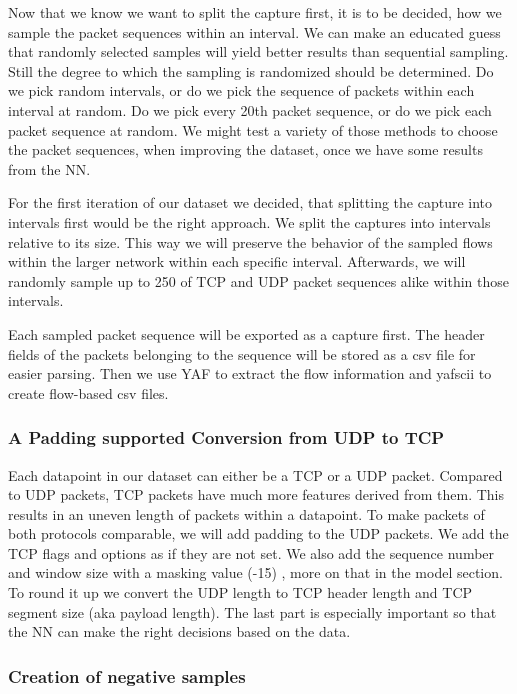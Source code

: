 \documentclass[
	ngerman,
	ruledheaders=section,%
	class=report,%
	thesis={type=bachelor},%
	accentcolor=9c,%
	custommargins=true,%
	marginpar=false,%
	parskip=half-,%
	fontsize=11pt,%
]{tudapub}
\begin{document}
Now that we know we want to split the capture first, it is to be decided, how we sample the packet sequences within an interval.
We can make an educated guess that randomly selected samples will yield better results than sequential sampling.
Still the degree to which the sampling is randomized should be determined.
Do we pick random intervals, or do we pick the sequence of packets within each interval at random.
Do we pick every 20th packet sequence, or do we pick each packet sequence at random.
We might test a variety of those methods to choose the packet sequences, when improving the dataset, once we have some results from the NN.

For the first iteration of our dataset we decided, that splitting the capture into intervals first would be the right approach.
We split the captures into intervals relative to its size.
This way we will preserve the behavior of the sampled flows within the larger network within each specific interval.
Afterwards, we will randomly sample up to 250 of TCP and UDP packet sequences alike within those intervals.

Each sampled packet sequence will be exported as a capture first.
The header fields of the packets belonging to the sequence will be stored as a csv file for easier parsing.
Then we use YAF to extract the flow information and yafscii to create flow-based csv files.

\subsubsection{A Padding supported Conversion from UDP to TCP}

Each datapoint in our dataset can either be a TCP or a UDP packet.
Compared to UDP packets, TCP packets have much more features derived from them.
This results in an uneven length of packets within a datapoint.
To make packets of both protocols comparable, we will add padding to the UDP packets.
We add the TCP flags and options as if they are not set.
We also add the sequence number and window size with a masking value (-15) , more on that in the model section.
To round it up we convert the UDP length to TCP header length and TCP segment size (aka payload length).
The last part is especially important so that the NN can make the right decisions based on the data.

\subsubsection{Creation of negative samples}
\end{document}
